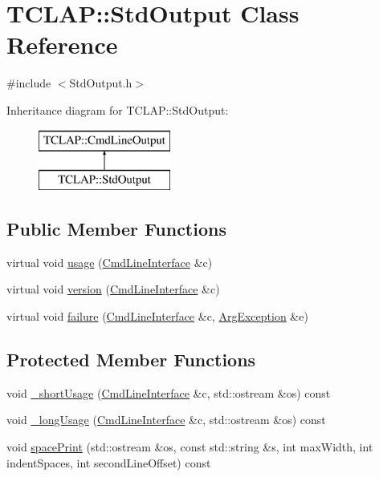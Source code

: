 \hypertarget{class_t_c_l_a_p_1_1_std_output}{}\section{T\+C\+L\+A\+P\+:\+:Std\+Output Class Reference}
\label{class_t_c_l_a_p_1_1_std_output}


{\ttfamily \#include $<$Std\+Output.\+h$>$}

Inheritance diagram for T\+C\+L\+A\+P\+:\+:Std\+Output\+:\begin{figure}[H]
\begin{center}
\leavevmode
\includegraphics[height=2.000000cm]{class_t_c_l_a_p_1_1_std_output}
\end{center}
\end{figure}
\subsection*{Public Member Functions}
\begin{DoxyCompactItemize}
\item 
virtual void \hyperlink{class_t_c_l_a_p_1_1_std_output_aeb10eb400e0ee45f2cde689bef606b49}{usage} (\hyperlink{class_t_c_l_a_p_1_1_cmd_line_interface}{Cmd\+Line\+Interface} \&c)
\item 
virtual void \hyperlink{class_t_c_l_a_p_1_1_std_output_a768111a59af4753ac6e5ace3ec99482e}{version} (\hyperlink{class_t_c_l_a_p_1_1_cmd_line_interface}{Cmd\+Line\+Interface} \&c)
\item 
virtual void \hyperlink{class_t_c_l_a_p_1_1_std_output_a9afc267e012c3ac42c8b1afe01f98556}{failure} (\hyperlink{class_t_c_l_a_p_1_1_cmd_line_interface}{Cmd\+Line\+Interface} \&c, \hyperlink{class_t_c_l_a_p_1_1_arg_exception}{Arg\+Exception} \&e)
\end{DoxyCompactItemize}
\subsection*{Protected Member Functions}
\begin{DoxyCompactItemize}
\item 
void \hyperlink{class_t_c_l_a_p_1_1_std_output_a60fa57587838d506d907f08800f2631c}{\+\_\+short\+Usage} (\hyperlink{class_t_c_l_a_p_1_1_cmd_line_interface}{Cmd\+Line\+Interface} \&c, std\+::ostream \&os) const 
\item 
void \hyperlink{class_t_c_l_a_p_1_1_std_output_ace725aebd685c16f464d697e85e0327d}{\+\_\+long\+Usage} (\hyperlink{class_t_c_l_a_p_1_1_cmd_line_interface}{Cmd\+Line\+Interface} \&c, std\+::ostream \&os) const 
\item 
void \hyperlink{class_t_c_l_a_p_1_1_std_output_a38661be8895e07c442c2c3138b7444a2}{space\+Print} (std\+::ostream \&os, const std\+::string \&s, int max\+Width, int indent\+Spaces, int second\+Line\+Offset) const 
\end{DoxyCompactItemize}


